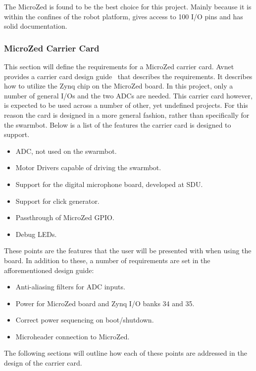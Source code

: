 The MicroZed is found to be the best choice for this project.
Mainly because it is within the confines of the robot platform, gives access to 100 I/O pins and has solid documentation.


\subsubsection*{MicroZed Carrier Card}
This section will define the requirements for a MicroZed carrier card.
Avnet provides a carrier card design guide~\cite{design_carrier} that describes the requirements.
It describes how to utilize the Zynq chip on the MicroZed board.
In this project, only a number of general I/Os and the two ADCs are needed.
This carrier card however, is expected to be used across a number of other, yet undefined projects.
For this reason the card is designed in a more general fashion, rather than specifically for the swarmbot.
Below is a list of the features the carrier card is designed to support.

\begin{itemize}
	\item ADC, not used on the swarmbot.
	\item Motor Drivers capable of driving the swarmbot.
	\item Support for the digital microphone board, developed at SDU.
	\item Support for click generator.
	\item Passthrough of MicroZed GPIO.
	\item Debug LEDs.
\end{itemize}

These points are the features that the user will be presented with when using the board.
In addition to these, a number of requirements are set in the afforementioned design guide:

\begin{itemize}
	\item Anti-aliasing filters for ADC inputs.
	\item Power for MicroZed board and Zynq I/O banks 34 and 35.
	\item Correct power sequencing on boot/shutdown.
	\item Microheader connection to MicroZed.
\end{itemize}

The following sections will outline how each of these points are addressed in the design of the carrier card.
